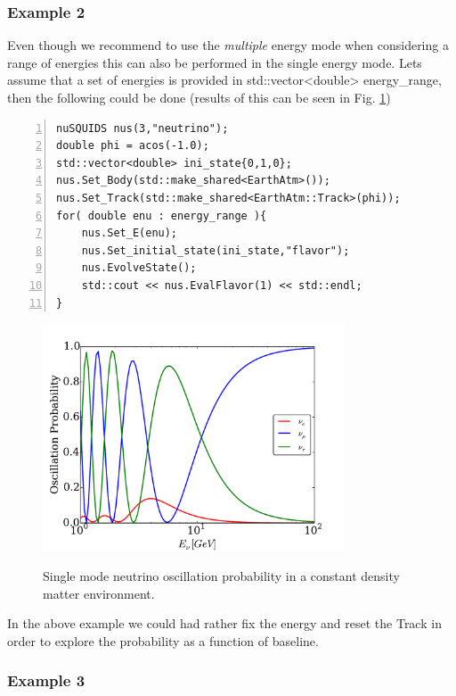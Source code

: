 \documentclass[3p,12pt,authoryear]{elsarticle}
\newcommand{\ttf}{\ttfamily}
\begin{document}
\subsubsection{Example 2}

Even though we recommend to use the {\it multiple} energy mode when considering a range of energies
this can also be performed in the single energy mode. Lets assume that a set of energies is provided in 
{\ttf std::vector<double> energy\_range}, then the following could be done (results of this can be seen in Fig. \ref{fig:atmo_osc})

\begin{lstlisting}[frame=leftline, numbers = left,breaklines=true]
nuSQUIDS nus(3,"neutrino");
double phi = acos(-1.0);
std::vector<double> ini_state{0,1,0};
nus.Set_Body(std::make_shared<EarthAtm>());
nus.Set_Track(std::make_shared<EarthAtm::Track>(phi));
for( double enu : energy_range ){
	nus.Set_E(enu);
	nus.Set_initial_state(ini_state,"flavor");
	nus.EvolveState();
	std::cout << nus.EvalFlavor(1) << std::endl;
}
\end{lstlisting}

\begin{figure}[h]
\begin{center}
\label{fig:atmo_osc}
\includegraphics[width=0.8\textwidth]{../fig/earth_oscillation.pdf}
\caption{Single mode neutrino oscillation probability in a constant density matter environment.}
\end{center}
\end{figure}

In the above example we could had rather fix the energy and reset the {\ttf Track} in order to explore the probability as a function of baseline. 

\subsubsection{Example 3}
\end{document}
